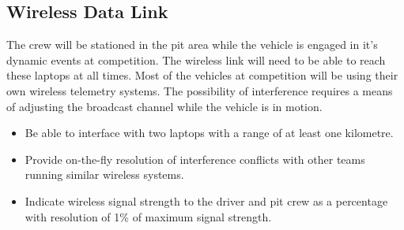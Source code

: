 \subsection{Wireless Data Link \label{sec:goals_telemetry_range}}

The crew will be stationed in the pit area while the vehicle is engaged in it's dynamic events at competition. The wireless link will need to be able to reach these laptops at all times. Most of the vehicles at competition will be using their own wireless telemetry systems. The possibility of interference requires a means of adjusting the broadcast channel while the vehicle is in motion. 

\begin{itemize}

\item Be able to interface with two laptops with a range of at least one kilometre.
\item Provide on-the-fly resolution of interference conflicts with other teams running similar wireless systems.
\item Indicate wireless signal strength to the driver and pit crew as a percentage with resolution of 1\% of maximum signal
strength. 

\end{itemize}
